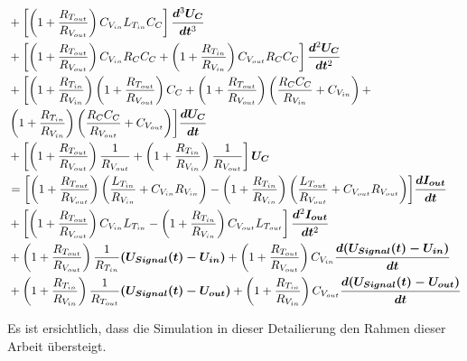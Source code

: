 \documentclass[fontsize=12pt, a4paper]{scrartcl}
\begin{document}
\begin{equation}
	\begin{split}
		&+ \left[\left(1+\frac{R_{T_{out}}}{R_{V_{out}}}\right)C_{V_{in}}L_{T_{in}}C_{C}\right]\bm{\frac{d\textsuperscript{3}U_{C}}{dt\textsuperscript{3}}} \\
		&+ \left[\left(1+\frac{R_{T_{out}}}{R_{V_{out}}}\right)C_{V_{in}}R_{C}C_{C} + \left(1+\frac{R_{T_{in}}}{R_{V_{in}}}\right)C_{V_{out}}R_{C}C_{C}\right]\bm{\frac{d\textsuperscript{2}U_{C}}{dt\textsuperscript{2}}} \\
		&+ \biggl[\left(1+\frac{R_{T_{in}}}{R_{V_{in}}}\right)\left(1+\frac{R_{T_{out}}}{R_{V_{out}}}\right)C_{C} + \left(1+\frac{R_{T_{out}}}{R_{V_{out}}}\right)\left(\frac{R_{C}C_{C}}{R_{V_{in}}}+C_{V_{in}}\right) + \\
		& \left(1+\frac{R_{T_{in}}}{R_{V_{in}}}\right)\left(\frac{R_{C}C_{C}}{R_{V_{out}}}+C_{V_{out}}\right)\biggr] \bm{\frac{dU_{C}}{dt}}  \\
		&+ \left[\left(1+\frac{R_{T_{out}}}{R_{V_{out}}}\right)\frac{1}{R_{V_{out}}} + \left(1+\frac{R_{T_{in}}}{R_{V_{in}}}\right)\frac{1}{R_{V_{out}}}\right]\bm{U_{C}} \\
		&= \biggl[\left(1+\frac{R_{T_{out}}}{R_{V_{out}}}\right)\left(\frac{L_{T_{in}}}{R_{V_{in}}}+C_{V_{in}}R_{V_{in}}\right) - \left(1+\frac{R_{T_{in}}}{R_{V_{in}}}\right)\left(\frac{L_{T_{out}}}{R_{V_{out}}}+C_{V_{out}}R_{V_{out}}\right)\biggr]\bm{\frac{dI_{out}}{dt}} \\
		&+ \left[\left(1+\frac{R_{T_{out}}}{R_{V_{out}}}\right)C_{V_{in}}L_{T_{in}} - \left(1+\frac{R_{T_{in}}}{R_{V_{in}}}\right)C_{V_{out}}L_{T_{out}}\right]\bm{\frac{d\textsuperscript{2}I_{out}}{dt\textsuperscript{2}}} \\
		&+ \left(1+\frac{R_{T_{out}}}{R_{V_{out}}}\right)\frac{1}{R_{T_{in}}}\bm{(U_{Signal}(t) - U_{in})}+ \left(1+\frac{R_{T_{out}}}{R_{V_{out}}}\right)C_{V_{in}}\bm{\frac{d(U_{Signal}(t) - U_{in})}{dt}} \\
		&+ \left(1+\frac{R_{T_{in}}}{R_{V_{in}}}\right)\frac{1}{R_{T_{out}}}\bm{(U_{Signal}(t) - U_{out})} + \left(1+\frac{R_{T_{in}}}{R_{V_{in}}}\right)C_{V_{out}}\bm{\frac{d(U_{Signal}(t) - U_{out})}{dt}}
	\end{split}
\end{equation}


Es ist ersichtlich, dass die Simulation in dieser Detailierung den Rahmen dieser Arbeit übersteigt.


\printbibliography
\end{document}
